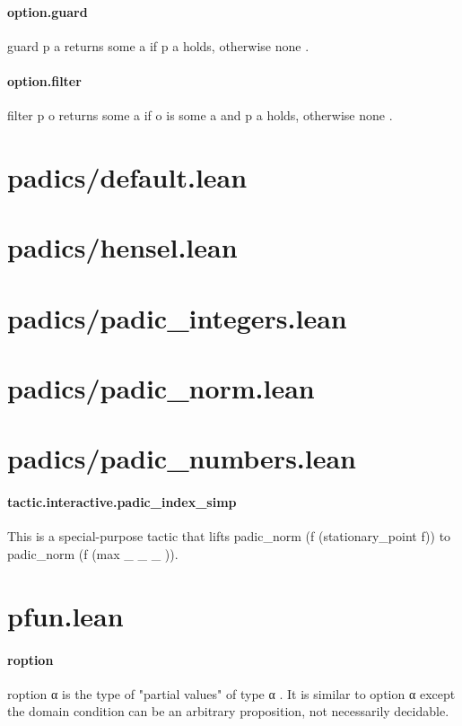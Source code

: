 \documentclass{article}
\begin{document}
\paragraph{option.guard}
\par
\colorbox[RGB]{253,246,227}{{{{\color[RGB]{101, 123, 131} guard p a }}}} returns 
\colorbox[RGB]{253,246,227}{{{{\color[RGB]{101, 123, 131} some a }}}} if 
\colorbox[RGB]{253,246,227}{{{{\color[RGB]{101, 123, 131} p a }}}} holds, otherwise 
\colorbox[RGB]{253,246,227}{{{{\color[RGB]{101, 123, 131} none }}}}.
\paragraph{option.filter}
\par
\colorbox[RGB]{253,246,227}{{{{\color[RGB]{101, 123, 131} filter p o }}}} returns 
\colorbox[RGB]{253,246,227}{{{{\color[RGB]{101, 123, 131} some a }}}} if 
\colorbox[RGB]{253,246,227}{{{{\color[RGB]{101, 123, 131} o }}}} is 
\colorbox[RGB]{253,246,227}{{{{\color[RGB]{101, 123, 131} some a }}}}and 
\colorbox[RGB]{253,246,227}{{{{\color[RGB]{101, 123, 131} p a }}}} holds, otherwise 
\colorbox[RGB]{253,246,227}{{{{\color[RGB]{101, 123, 131} none }}}}.
\section{padics/default.lean}\section{padics/hensel.lean}\section{padics/padic\_integers.lean}\section{padics/padic\_norm.lean}\section{padics/padic\_numbers.lean}\paragraph{tactic.interactive.padic\_index\_simp}
\par
This is a special-purpose tactic that lifts padic\_norm (f (stationary\_point f)) to
padic\_norm (f (max \_ \_ 
\_
)).
\section{pfun.lean}\paragraph{roption}
\par
\colorbox[RGB]{253,246,227}{{{{\color[RGB]{101, 123, 131} roption α }}}} is the type of "partial values" of type 
\colorbox[RGB]{253,246,227}{{{{\color[RGB]{101, 123, 131} α }}}}. It
is similar to 
\colorbox[RGB]{253,246,227}{{{{\color[RGB]{101, 123, 131} option α }}}} except the domain condition can be an
arbitrary proposition, not necessarily decidable.
\end{document}
